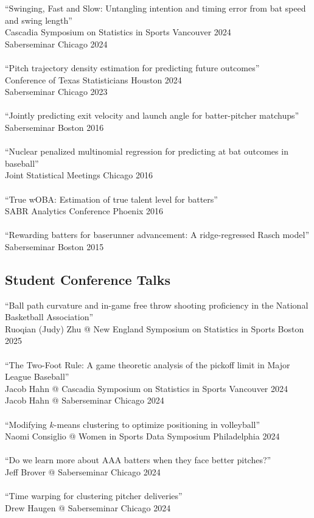 \documentclass{article}
\begin{document}
``Swinging, Fast and Slow: Untangling intention and timing error from bat speed and swing length''\\
Cascadia Symposium on Statistics in Sports \hfill Vancouver 2024\\
Saberseminar \hfill Chicago 2024\\
~\\
``Pitch trajectory density estimation for predicting future outcomes''\\
Conference of Texas Statisticians \hfill Houston 2024\\
Saberseminar \hfill Chicago 2023\\
~\\
``Jointly predicting exit velocity and launch angle for batter-pitcher matchups''\\
Saberseminar \hfill Boston 2016\\
~\\
``Nuclear penalized multinomial regression for predicting at bat outcomes in baseball''\\
Joint Statistical Meetings \hfill Chicago 2016\\
~\\
``True wOBA: Estimation of true talent level for batters''\\
SABR Analytics Conference \hfill Phoenix 2016\\
~\\
``Rewarding batters for baserunner advancement: A ridge-regressed Rasch model''\\
Saberseminar \hfill Boston 2015

\subsection*{\sc Student Conference Talks}

``Ball path curvature and in-game free throw shooting proficiency in the National Basketball Association''\\
Ruoqian (Judy) Zhu @ New England Symposium on Statistics in Sports \hfill Boston 2025\\
~\\
``The Two-Foot Rule: A game theoretic analysis of the pickoff limit in Major League Baseball''\\
Jacob Hahn @ Cascadia Symposium on Statistics in Sports \hfill Vancouver 2024\\
Jacob Hahn @ Saberseminar \hfill Chicago 2024\\
~\\
``Modifying $k$-means clustering to optimize positioning in volleyball''\\
Naomi Consiglio @ Women in Sports Data Symposium \hfill Philadelphia 2024\\
~\\
``Do we learn more about AAA batters when they face better pitches?''\\
Jeff Brover @ Saberseminar \hfill Chicago 2024\\
~\\
``Time warping for clustering pitcher deliveries''\\
Drew Haugen @ Saberseminar \hfill Chicago 2024
\end{document}
